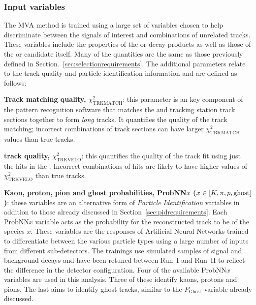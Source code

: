 
\subsubsection{Input variables}


The MVA method is trained using a large set of variables chosen to help discriminate between the signals of interest and combinations of unrelated tracks. These variables include the properties of the \Kpm or \pipm decay products as well as those of the \phiz or \Dsp candidate itself. Many of the quantities are the same as those previously defined in Section.~\ref{sec:selectionrequirements}. The additional parameters relate to the track quality and particle identification information and are defined as follows:

\begin{description}
\item \textbf{Track matching quality, $\chi^{2}_{\text{TRKMATCH}}$}: this parameter is an key component of the pattern recognition software that matches the \velo and tracking station track sections together to form \emph{long} tracks. It quantifies the quality of the track matching; incorrect combinations of track sections can have larger $\chi^{2}_{\text{TRKMATCH}}$ values than true tracks.  

\item \textbf{\velo track quality, $\chi^{2}_{\text{TRKVELO}}$}: this quantifies the quality of the track fit using just the hits in the \velo. Incorrect combinations of hits are likely to have higher values of $\chi^{2}_{\text{TRKVELO}}$ than true tracks.  


\item \textbf{Kaon, proton, pion and ghost probabilities, ProbNN$x$ ($x\in[K,\pi,{p},\text{ghost}]$)}: these variables are an alternative form of \emph{Particle Identification} variables in addition to those already discussed in Section~\ref{sec:pidrequirements}. Each ProbNN$x$ variable acts as the probability for the reconstructed track to be of the species $x$. These variables are the responses of Artificial Neural Networks trained to differentiate between the various particle types using a large number of inputs from different sub-detectors. The trainings use simulated samples of signal and background decays and have been retuned between Run~I and Run~II to reflect the difference in the detector configuration. Four of the available ProbNN$x$ variables are used in this analysis. Three of these identify kaons, protons and pions. The last aims to identify ghost tracks, similar to the $P_{\text{Ghost}}$ variable already discussed. 
\end{description}

